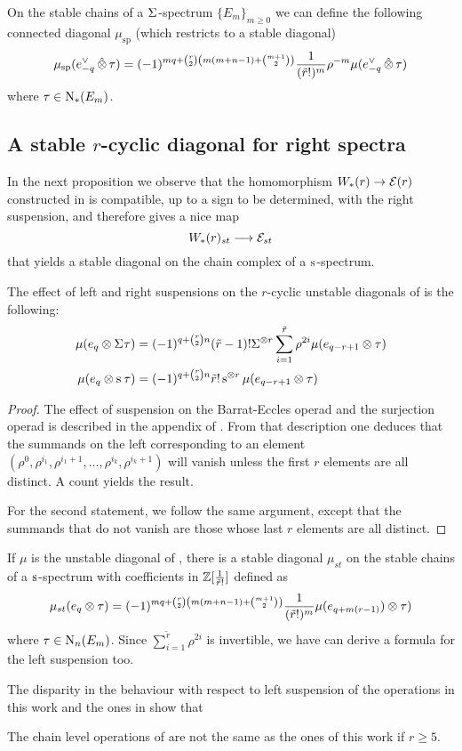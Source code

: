 \begin{corollary}
 On the stable chains of a $\susp{}$-spectrum $\{E_m\}_{m \geq 0}$ we can define the following connected diagonal $\mu_{\mathrm{sp}}$ (which restricts to a stable diagonal)
 \[
 \mu_{\mathrm{sp}}(e_{-q}^\dd \hotimes \tau) = (-1)^{mq+\binom{r}{2}\left(m(m+n-1) + \binom{m+1}{2}\right)}\frac{1}{(\tilde{r}!)^{m}}\rho^{-m} \mu(e_{-q}^\dd \hotimes \tau)
 \]
 where $\tau\in \chains(E_m)$.
\end{corollary}


\subsection{A stable $r$-cyclic diagonal for right spectra} In the next proposition we observe that the homomorphism $W_*(r) \to \cE(r)$ constructed in \cite{medina2021may_st} is compatible, up to a sign to be determined, with the right suspension, and therefore gives a nice map
\[
 W_*(r)_{st} \lra \cE_{st}
\]
that yields a stable diagonal on the chain complex of a $\sus{}$-spectrum.

\begin{proposition}\label{prop:suspensionunstable}
 The effect of left and right suspensions on the $r$-cyclic unstable diagonals of \cite{medina2021may_st} is the following:
 \begin{align*}
 \mu(e_q \ot \susp{} \tau) &= (-1)^{q+\binom{r}{2}n}(\tilde{r}-1)!\susp{\ot r}\sum_{i=1}^{\tilde{r}} \rho^{2i}\mu(e_{q-r+1} \ot \tau)
 \\
 \mu(e_q \ot \sus{}\tau) &= (-1)^{q+\binom{r}{2}n}\tilde{r}!\sus{\ot r}\mu(e_{q-r+1} \ot \tau)
 \end{align*}
\end{proposition}

\begin{proof}
 The effect of suspension on the Barrat-Eccles operad and the surjection operad is described in the appendix of \cite{berger2004combinatorial}. From that description one deduces that the summands on the left corresponding to an element $(\rho^0,\rho^{i_1},\rho^{i_1+1},\dots,\rho^{i_k},\rho^{i_k+1})$ will vanish unless the first $r$ elements are all distinct. A count yields the result.

 For the second statement, we follow the same argument, except that the summands that do not vanish are those whose last $r$ elements are all distinct.
\end{proof}

 If $\mu$ is the unstable diagonal of \cite{medina2021may_st}, there is a stable diagonal $\mu_{st}$ on the stable chains of a $\sus{}$-spectrum with coefficients in $\bZ[\frac{1}{\tilde{r}!}]$ defined as
 \[
 \mu_{st}(e_q \ot \tau) = (-1)^{mq+\binom{r}{2}\left(m(m+n-1) + \binom{m+1}{2}\right)}\frac{1}{(\tilde{r}!)^{m}}\mu(e_{q+m(r-1)}) \ot \tau)
 \]
 where $\tau\in \chains[n](E_m)$. Since $\sum_{i=1}^{\tilde{r}} \rho^{2i}$ is invertible, we have can derive a formula for the left suspension too.

 The disparity in the behaviour with respect to left suspension of the operations in this work and the ones in \cite{medina2021may_st} show that

 \begin{corollary}
	The chain level operations of \cite{medina2021may_st} are not the same as the ones of this work if $r\geq 5$.
\end{corollary}


